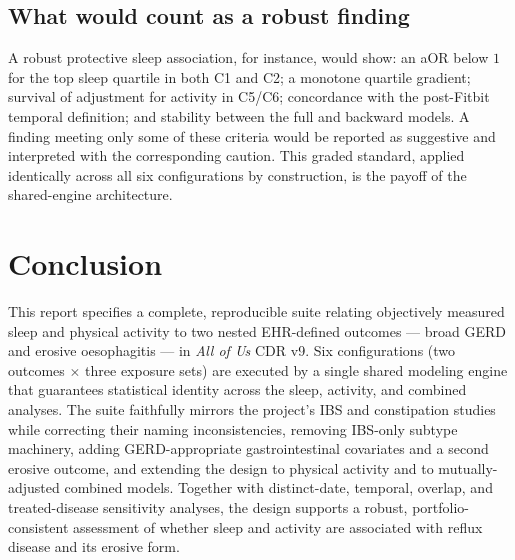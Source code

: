 \documentclass[11pt]{article}
\begin{document}
\subsection{What would count as a robust finding}
A robust protective sleep association, for instance, would show: an aOR below $1$ for the top sleep
quartile in both C1 and C2; a monotone quartile gradient; survival of adjustment for activity in C5/C6;
concordance with the post-Fitbit temporal definition; and stability between the full and backward
models. A finding meeting only some of these criteria would be reported as suggestive and interpreted
with the corresponding caution. This graded standard, applied identically across all six configurations
by construction, is the payoff of the shared-engine architecture.

\section{Conclusion}
This report specifies a complete, reproducible suite relating objectively measured sleep and physical
activity to two nested EHR-defined outcomes --- broad GERD and erosive oesophagitis --- in \emph{All of
Us} CDR v9. Six configurations (two outcomes $\times$ three exposure sets) are executed by a single
shared modeling engine that guarantees statistical identity across the sleep, activity, and combined
analyses. The suite faithfully mirrors the project's IBS and constipation studies while correcting
their naming inconsistencies, removing IBS-only subtype machinery, adding GERD-appropriate
gastrointestinal covariates and a second erosive outcome, and extending the design to physical activity
and to mutually-adjusted combined models. Together with distinct-date, temporal, overlap, and
treated-disease sensitivity analyses, the design supports a robust, portfolio-consistent assessment of
whether sleep and activity are associated with reflux disease and its erosive form.

\appendix
\newpage
\end{document}
